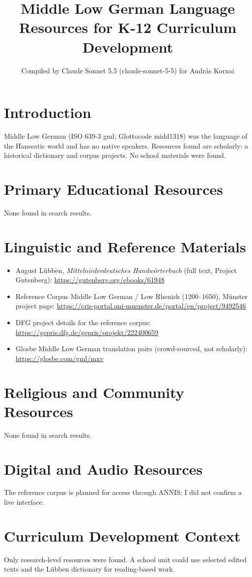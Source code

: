 \documentclass[12pt]{article}
\title{Middle Low German Language Resources for K-12 Curriculum Development}
\author{Compiled by Claude Sonnet 5.5 (claude-sonnet-5-5) for Andr\'as Kornai}
\date{}
\begin{document}
\maketitle

\section{Introduction}
Middle Low German (ISO 639-3 gml; Glottocode midd1318) was the language of the Hanseatic world and has no native speakers. Resources found are scholarly: a historical dictionary and corpus projects. No school materials were found.

\section{Primary Educational Resources}
None found in search results.

\section{Linguistic and Reference Materials}
\begin{itemize}
\item August L\"ubben, \emph{Mittelniederdeutsches Handw\"orterbuch} (full text, Project Gutenberg): \url{https://gutenberg.org/ebooks/61948}
\item Reference Corpus Middle Low German / Low Rhenish (1200--1650), M\"unster project page: \url{https://cris-portal.uni-muenster.de/portal/en/project/9492546}
\item DFG project details for the reference corpus: \url{https://gepris.dfg.de/gepris/projekt/222400659}
\item Glosbe Middle Low German translation pairs (crowd-sourced, not scholarly): \url{https://glosbe.com/gml/mxv}
\end{itemize}

\section{Religious and Community Resources}
None found in search results.

\section{Digital and Audio Resources}
The reference corpus is planned for access through ANNIS; I did not confirm a live interface.

\section{Curriculum Development Context}
Only research-level resources were found. A school unit could use selected edited texts and the Lübben dictionary for reading-based work.
\end{document}
